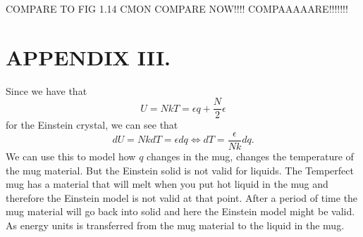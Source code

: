 \documentclass[reprint,english,notitlepage]{revtex4-1}  %
\begin{document}
COMPARE TO FIG 1.14 CMON COMPARE NOW!!!! COMPAAAAARE!!!!!!!

\section*{APPENDIX III.}
Since we have that 
$$U=NkT=\epsilon q+\frac{N}{2}\epsilon$$ 
for the Einstein crystal, we can see that
$$ dU=NkdT=\epsilon dq\Leftrightarrow dT=\frac{\epsilon}{Nk}dq.$$
We can use this to model how $q$ changes in the mug, changes the temperature of the mug material. But the Einstein solid is not valid for liquids. The Temperfect mug has a material that will melt when you put hot liquid in the mug and therefore the Einstein model is not valid at that point. After a period of time the mug material will go back into solid and here the Einstein model might be valid. As energy units is transferred from the mug material to the liquid in the mug. 




\end{document}
